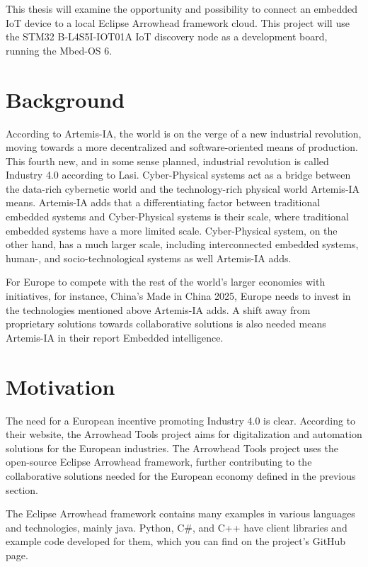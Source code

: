 This thesis will examine the opportunity and possibility to connect an embedded IoT device to a local Eclipse Arrowhead framework cloud.
This project will use the STM32 B-L4S5I-IOT01A IoT discovery node as a development board, running the Mbed-OS 6. 
\section{Background}
According to Artemis-IA, the world is on the verge of a new industrial revolution, moving towards a more decentralized and software-oriented means of production.\cite{Artemis2021}
This fourth new, and in some sense planned, industrial revolution is called Industry 4.0 according to Lasi.\cite{Lasi2014} 
Cyber-Physical systems act as a bridge between the data-rich cybernetic world and the technology-rich physical world Artemis-IA means.
Artemis-IA adds that a differentiating factor between traditional embedded systems and Cyber-Physical systems is their scale, where traditional embedded systems have a more limited scale.
Cyber-Physical system, on the other hand, has a much larger scale, including interconnected embedded systems, human-, and socio-technological systems as well Artemis-IA adds.\cite{Artemis2021}

For Europe to compete with the rest of the world's larger economies with initiatives, for instance, China's Made in China 2025, Europe needs to invest in the technologies mentioned above Artemis-IA adds.
A shift away from proprietary solutions towards collaborative solutions is also needed means Artemis-IA in their report Embedded intelligence.\cite{Artemis2021} 
\section{Motivation}
The need for a European incentive promoting Industry 4.0 is clear. 
According to their website, the Arrowhead Tools project aims for digitalization and automation solutions for the European industries.\cite{AT2021}
The Arrowhead Tools project uses the open-source Eclipse Arrowhead framework, further contributing to the collaborative solutions needed for the European economy defined in the previous section.

The Eclipse Arrowhead framework contains many examples in various languages and technologies, mainly java.
Python, C\#, and C++ have client libraries and example code developed for them, which you can find on the project's GitHub page.\cite{AC2021} 


